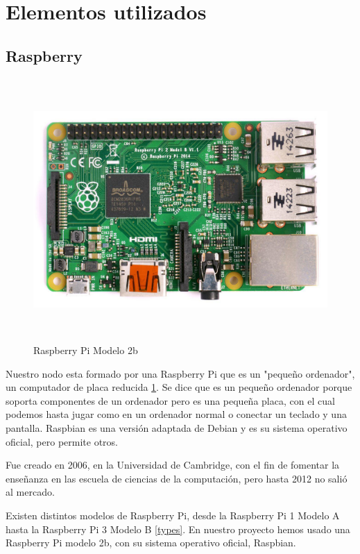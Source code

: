 \section{Elementos utilizados}
\label{makereference4.2}
\subsection{Raspberry}

\begin{figure}[htb]
	
	\begin{center}
		\includegraphics[width=12cm,height=10cm]{figures/Raspberry_Pi.jpg}
		\caption{Raspberry Pi Modelo 2b}
	\end{center}
	
	\label{rasp}
\end{figure}

Nuestro nodo esta formado por una Raspberry Pi que es un "pequeño ordenador", un computador de placa reducida \ref{rasp}. Se dice que es un pequeño ordenador porque soporta componentes de un ordenador pero es una pequeña placa, con el cual podemos hasta jugar como en un ordenador normal o conectar un teclado y una pantalla.
Raspbian es una versión adaptada de Debian y es su sistema operativo oficial, pero permite otros.
 
Fue creado en 2006, en la Universidad de Cambridge, con el fin de fomentar la enseñanza en las escuela de ciencias de la computación, pero hasta 2012 no salió al mercado.

Existen distintos modelos de Raspberry Pi, desde la Raspberry Pi 1 Modelo A hasta la Raspberry Pi 3 Modelo B \ref{types}.
En nuestro proyecto hemos usado una Raspberry Pi modelo 2b, con su sistema operativo oficial, Raspbian.


